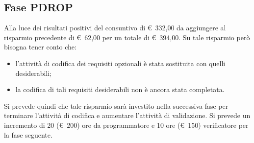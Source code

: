 \documentclass[../PianoProgetto.tex]{subfiles}
\begin{document}
	\subsection{Fase PDROP}
		Alla luce dei risultati positivi del consuntivo di \euro\ 332,00 da aggiungere al risparmio precedente di \euro\ 62,00 per un totale di \euro\ 394,00. Su tale risparmio però bisogna tener conto che:
		\begin{itemize} 
			\item l'attività di codifica dei requisiti opzionali è stata sostituita con quelli desiderabili;
			\item la codifica di tali requisiti desiderabili non è ancora stata completata.
		\end{itemize}
		Si prevede quindi che tale risparmio sarà investito nella successiva fase per terminare l'attività di codifica e aumentare l'attività di validazione. Si prevede un incremento di 20 (\euro\ 200) ore da programmatore e 10 ore (\euro\ 150) verificatore per la fase seguente.
		
\end{document}
